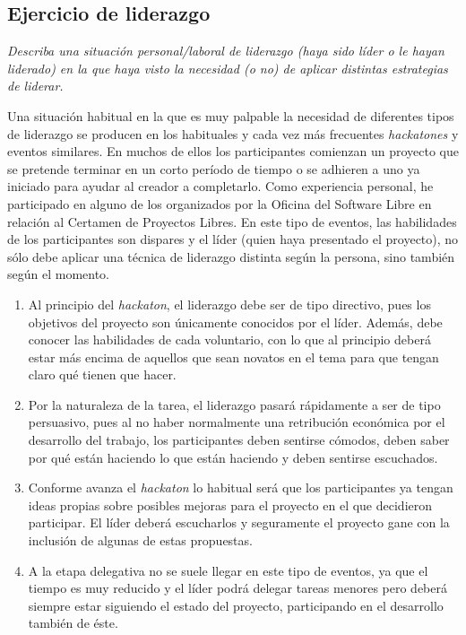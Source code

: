\documentclass[11pt,leqno]{article}
\begin{document}
\newpage
\subsection{Ejercicio de liderazgo}

\textit{Describa una situación personal/laboral de liderazgo
(haya sido líder o le hayan liderado) en la que haya visto
la necesidad (o no) de aplicar distintas estrategias de
liderar.}


	Una situación habitual en la que es muy palpable la necesidad de diferentes
tipos de liderazgo se producen en los habituales y cada vez más frecuentes
\textit{hackatones} y eventos similares. En muchos de ellos los participantes
comienzan un proyecto que se pretende terminar en un corto período de tiempo 
o se adhieren a uno ya iniciado para ayudar al creador a completarlo.
Como experiencia personal, he participado en alguno de los organizados por la
Oficina del Software Libre en relación al Certamen de Proyectos Libres. En este 
tipo de eventos, las habilidades de los participantes son dispares y el líder
(quien haya presentado el proyecto), no sólo debe aplicar una técnica de liderazgo 
distinta según la persona, sino también según el momento.

\begin{enumerate}
\item Al principio del \textit{hackaton}, el liderazgo debe ser de tipo directivo,
pues los objetivos del proyecto son únicamente conocidos por el líder. Además,
debe conocer las habilidades de cada voluntario, con lo que 
al principio deberá estar más encima de aquellos que sean novatos en el tema
para que tengan claro qué tienen que hacer.
\item Por la naturaleza de la tarea, el liderazgo pasará rápidamente a ser de tipo
persuasivo, pues al no haber normalmente una retribución económica por el 
desarrollo del trabajo, los participantes deben sentirse cómodos, deben 
saber por qué están haciendo lo que están haciendo y deben sentirse escuchados.
\item Conforme avanza el \textit{hackaton} lo habitual será que los participantes ya
tengan ideas propias sobre posibles mejoras para el proyecto en el que
decidieron participar. El líder deberá escucharlos y seguramente el proyecto
gane con la inclusión de algunas de estas propuestas.
\item A la etapa delegativa no se suele llegar en este tipo de eventos, 
ya que el tiempo es muy reducido y el líder podrá delegar tareas menores 
pero deberá siempre estar siguiendo el estado del proyecto, participando
en el desarrollo también de éste.
\end{enumerate}
\end{document}

